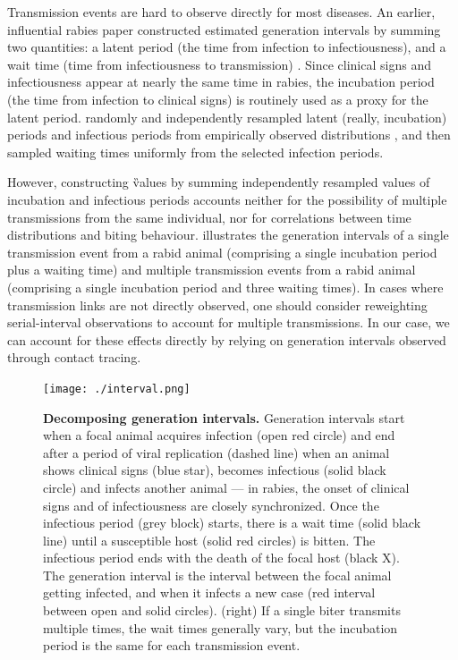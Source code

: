 Transmission events are hard to observe directly for most diseases.
An earlier, influential rabies paper constructed estimated generation intervals by summing two quantities: a latent period (the time from infection to infectiousness), and a wait time (time from infectiousness to transmission) \citep{hampson2009transmission}.
Since clinical signs and infectiousness appear at nearly the same time in rabies, the incubation period (the time from infection to clinical signs) is routinely used as a proxy for the latent period.
\citeauthor{hampson2009transmission} randomly and independently resampled latent (really, incubation) periods and infectious periods from empirically observed distributions \citep{hampson2009transmission}, and then sampled waiting times uniformly from the selected infection periods.

However, constructing \G values by summing independently resampled values of incubation and infectious periods accounts neither for the possibility of multiple transmissions from the same individual, nor for correlations between time distributions and biting behaviour.
 illustrates the generation intervals of a single transmission event from a rabid animal (comprising a single incubation period plus a waiting time) and multiple transmission events from a rabid animal (comprising a single incubation period and three waiting times).
In cases where transmission links are not directly observed, one should consider reweighting serial-interval observations to account for  multiple transmissions. In our case, we can account for these effects directly by relying on generation intervals observed through contact tracing.

\begin{center}
\begin{figure}[ht!]
\texttt{[image: ./interval.png]}
\caption{\textbf{Decomposing generation intervals.}
Generation intervals start when a focal animal acquires infection (open red circle) and end after a period of viral replication (dashed line) when an animal shows clinical signs (blue star), becomes infectious (solid black circle) and infects another animal --- in rabies, the onset of clinical signs and of infectiousness are closely synchronized.
Once the infectious period (grey block) starts, there is a wait time (solid black line) until a susceptible host (solid red circles) is bitten. The infectious period ends with the death of the focal host (black X).
The generation interval is the interval between the focal animal getting infected, and when it infects a new case (red interval between open and solid circles). (right) If a single biter transmits multiple times, the wait times generally vary, but the incubation period is the same for each transmission event.}
\end{figure}
\end{center}

